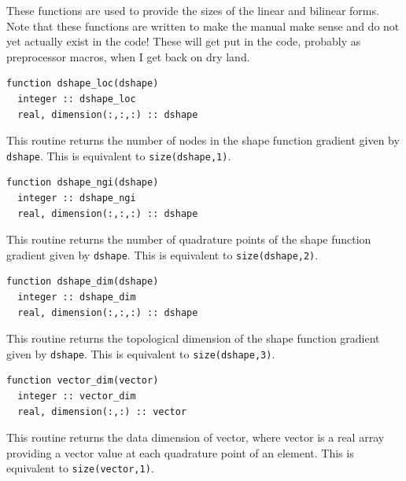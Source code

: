\documentclass[a4paper, 11pt]{book}
\begin{document}
These functions are used to provide the sizes of the linear and bilinear
forms. Note that these functions are written to make the manual make sense
and do not yet actually exist in the code! These will get put in the code,
probably as preprocessor macros, when I get back on dry land.


\begin{lstlisting}
function dshape_loc(dshape)
  integer :: dshape_loc
  real, dimension(:,:,:) :: dshape
\end{lstlisting}

This routine returns the number of nodes in the shape function
gradient given by \lstinline+dshape+. This is equivalent to
\lstinline+size(dshape,1)+.



\begin{lstlisting}
function dshape_ngi(dshape)
  integer :: dshape_ngi
  real, dimension(:,:,:) :: dshape
\end{lstlisting}

This routine returns the number of quadrature points of the shape function
gradient given by \lstinline+dshape+. This is equivalent to
\lstinline+size(dshape,2)+.



\begin{lstlisting}
function dshape_dim(dshape)
  integer :: dshape_dim
  real, dimension(:,:,:) :: dshape
\end{lstlisting}

This routine returns the topological dimension of the shape function
gradient given by \lstinline+dshape+. This is equivalent to
\lstinline+size(dshape,3)+.



\begin{lstlisting}
function vector_dim(vector)
  integer :: vector_dim
  real, dimension(:,:) :: vector
\end{lstlisting}

This routine returns the data dimension of vector, where vector is a real
array providing a vector value at each quadrature point of an element. 
 This is equivalent to \lstinline+size(vector,1)+.


\end{document}
